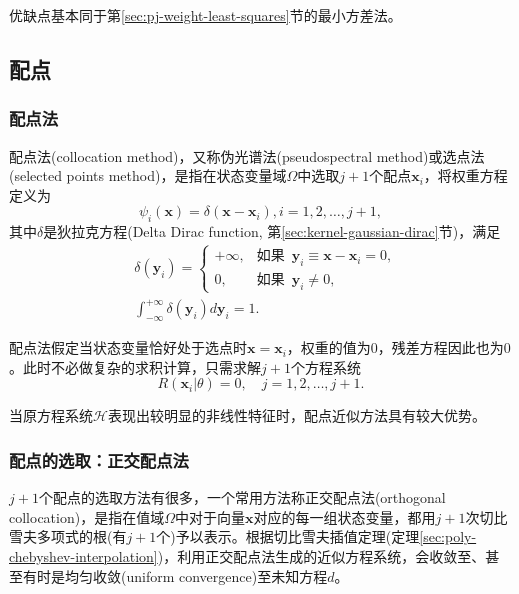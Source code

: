 优缺点基本同于第\ref{sec:pj-weight-least-squares}节的最小方差法。

\subsection{配点}
\label{sec:pj-weight-collocation}
\subsubsection{配点法}
\label{sec:pj-weight-collocation-method}
配点法(collocation method)，又称伪光谱法(pseudospectral method)或选点法(selected points method)，是指在状态变量域$\Omega$中选取$j+1$个配点$\bm{x}_i$，将权重方程定义为
\begin{equation*}
  \psi_i(\bm{x}) = \delta(\bm{x} - \bm{x}_i), i=1,2,\ldots,j+1,
\end{equation*}
其中$\delta$是狄拉克方程(Delta Dirac function, 第\ref{sec:kernel-gaussian-dirac}节)，满足
\begin{equation*}
  \begin{split}
    &\delta(\bm{y}_i) = \begin{cases}
    +\infty, &\text{如果 }\, \bm{y}_i \equiv \bm{x} - \bm{x}_i =0,\\
     0, &\text{如果 }\, \bm{y}_i \neq 0,
    \end{cases} \\
    &\int_{-\infty}^{+\infty} \delta(\bm{y}_i) d \bm{y}_i
 = 1.
  \end{split}
\end{equation*}

配点法假定当状态变量恰好处于选点时$\bm{x} = \bm{x}_i$，权重的值为$0$，残差方程因此也为$0$。此时不必做复杂的求积计算，只需求解$j+1$个方程系统
\begin{equation*}
  R\left( \bm{x}_i | \theta \right) =0, \quad j=1,2,\ldots,j+1.
\end{equation*}

当原方程系统$\mathcal{H}$表现出较明显的非线性特征时，配点近似方法具有较大优势。

\subsubsection{配点的选取：正交配点法}
\label{sec:pj-weight-collocation-orthogonal}

$j+1$个配点的选取方法有很多，一个常用方法称正交配点法(orthogonal collocation)，是指在值域$\Omega$中对于向量$\bm{x}$对应的每一组状态变量，都用$j+1$次切比雪夫多项式的根(有$j+1$个)予以表示。根据切比雪夫插值定理(定理\ref{sec:poly-chebyshev-interpolation})，利用正交配点法生成的近似方程系统，会收敛至、甚至有时是均匀收敛(uniform convergence)至未知方程$d$。

